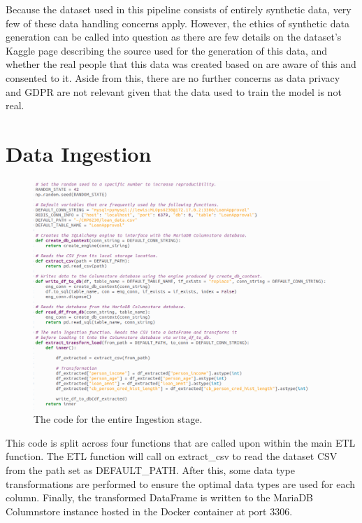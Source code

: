 \documentclass[12pt]{report}
\newcommand{\para}{\vspace{7pt}\noindent}
\begin{document}
\noindent Because the dataset used in this pipeline consists of entirely synthetic data, very few of these data handling concerns apply. 
However, the ethics of synthetic data generation can be called into question as there are few details on the dataset's Kaggle 
page describing the source used for the generation of this data, and whether the real people that this data was created based 
on are aware of this and consented to it. Aside from this, there are no further concerns as data privacy and GDPR are not 
relevant given that the data used to train the model is not real.





\section{Data Ingestion}\label{sec:ImpIngestion}

\begin{figure}[H]
    \centering
    \includegraphics[width=\linewidth]{Implementation/.Code/PipelineFunctions/Ingestion.png}
    \caption{The code for the entire Ingestion stage.}
    \label{fig:IngestionCode}
\end{figure}

\para This code is split across four functions that are called upon within the main 
ETL function. The ETL function will call on extract\_csv to read the dataset CSV from 
the path set as DEFAULT\_PATH. After this, some data type transformations are performed 
to ensure the optimal data types are used for each column. Finally, the transformed 
DataFrame is written to the MariaDB Columnstore instance hosted in the Docker 
container at port 3306.
\end{document}
